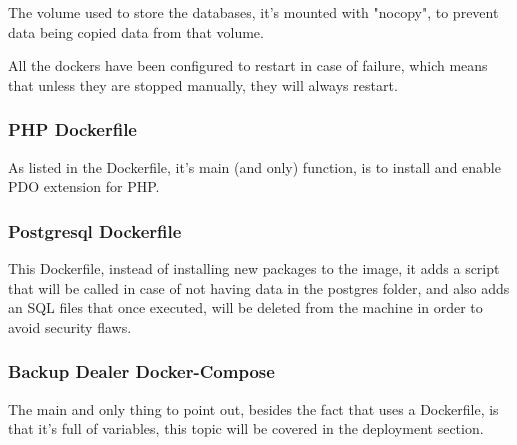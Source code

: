     \begin{flushleft}
        The volume used to store the databases, it's mounted with "nocopy", to prevent data being copied data from that volume.
    \end{flushleft}
    \begin{flushleft}
        All the dockers have been configured to restart in case of failure, which means that unless they are stopped manually,
        they will always restart.
    \end{flushleft}


    \newpage
    \subsubsection[PHP Dockerfile]{PHP Dockerfile}
    
    \begin{flushleft}
        As listed in the Dockerfile, it's main (and only) function, is to install and enable PDO extension for PHP\@.
    \end{flushleft}

    \newpage
    \subsubsection[Postgresql Dockerfile]{Postgresql Dockerfile}
    
    \begin{flushleft}
        This Dockerfile, instead of installing new packages to the image, it adds a script that will be called in case
        of not having data in the postgres folder, and also adds an SQL files that once executed, will be deleted
        from the machine in order to avoid security flaws.
    \end{flushleft}

    \newpage
    \subsubsection[Backup Dealer Docker-Compose]{Backup Dealer Docker-Compose}
    
    \begin{flushleft}
        The main and only thing to point out, besides the fact that uses a Dockerfile, is that it's full of variables,
        this topic will be covered in the deployment section.
    \end{flushleft}

